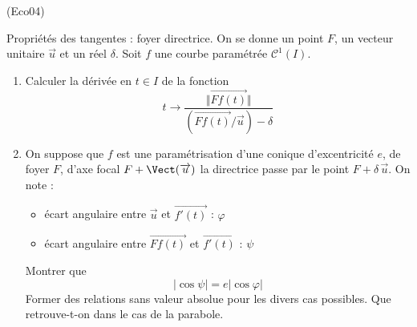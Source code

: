 \begin{tiny}(Eco04)\end{tiny} Propriétés des tangentes : foyer directrice.\newline
On se donne un point $F$, un vecteur unitaire $\overrightarrow u$ et un réel $\delta$. Soit $f$ une courbe paramétrée $\mathcal{C}^1(I)$.
\begin{enumerate}
 \item Calculer la dérivée en $t\in I$ de la fonction
\begin{displaymath}
 t \rightarrow \frac{\Vert \overrightarrow{Ff(t)}\Vert}{(\overrightarrow{Ff(t)}/\overrightarrow u) - \delta}
\end{displaymath}
\item On suppose que $f$ est une paramétrisation d'une conique d'excentricité $e$, de foyer $F$, d'axe focal $F+\Vect(\overrightarrow u)$ la directrice passe par le point $F+\delta\,\overrightarrow u$. On note :
\begin{itemize}
 \item écart angulaire entre $\overrightarrow u$ et $\overrightarrow{f'(t)}$ : $\varphi$
 \item écart angulaire entre $\overrightarrow{Ff(t)}$ et $\overrightarrow{f'(t)}$ : $\psi$
\end{itemize}
Montrer que 
\begin{displaymath}
 |\cos \psi | = e |\cos \varphi|
\end{displaymath}
Former des relations sans valeur absolue pour les divers cas possibles. Que retrouve-t-on dans le cas de la parabole.
\end{enumerate}
